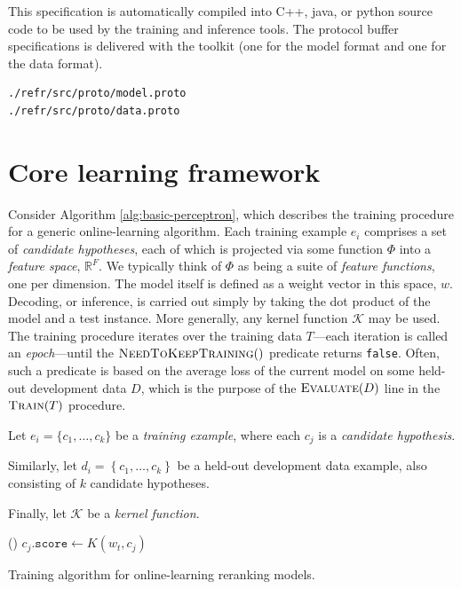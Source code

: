 \documentclass[a4paper]{article}
\begin{document}
This specification is automatically compiled into C++, java, or python source code to be
used by the training and inference tools.  The protocol buffer specifications is
delivered with the toolkit (one for the model format and one for the data
format).
\begin{verbatim}
./refr/src/proto/model.proto
./refr/src/proto/data.proto
\end{verbatim}


\section{Core learning framework}

Consider Algorithm \ref{alg:basic-perceptron}, which describes the
training procedure for a generic online-learning algorithm. Each
training example $e_{i}$ comprises a set of \emph{candidate hypotheses},
each of which is projected via some function $\Phi$ into a \emph{feature
space}, $\mathbb{R}^{F}$. We typically think of $\Phi$ as being
a suite of \emph{feature functions}, one per dimension.\emph{ }The\emph{
}model itself is defined as a weight vector in this space, $w$. Decoding,
or inference, is carried out simply by taking the dot product of the
model and a test instance. More generally, any kernel function $\mathcal{K}$
may be used. The training procedure iterates over the training data
$T$---each iteration is called an \emph{epoch}---until the $\Call{NeedToKeepTraining}{}()$
predicate returns \texttt{false}. Often, such a predicate is based
on the average loss of the current model on some held-out development
data $D$, which is the purpose of the $\Call{Evaluate}{D}$ line
in the $\Call{Train}{T}$ procedure.

\begin{algorithm}
Let $e_{i}=\{c_{1},\ldots,c_{k}\}$ be a \emph{training example},
where each $c_{j}$ is a \emph{candidate hypothesis}.

Similarly, let $d_{i}=\left\{ c_{1},\ldots,c_{k}\right\} $ be a held-out
development data example, also consisting of $k$ candidate hypotheses.

Finally, let $\mathcal{K}$ be a \emph{kernel function}.

\renewcommand\algorithmicforall{\textbf{foreach}}
\begin{algorithmic}
    \State {}
    \State {}
  \EndWhile
\EndProcedure
\State
{}
    \State {}
      \State {}()
    \EndIf
  \EndFor
\EndProcedure
\State
{}
    \State $c_j.\texttt{score} \leftarrow K(w_t, c_j)$
  \EndFor
\EndProcedure
\end{algorithmic}

\caption{\label{alg:basic-perceptron}Training algorithm for online-learning
reranking models.}
\end{algorithm}
\end{document}
